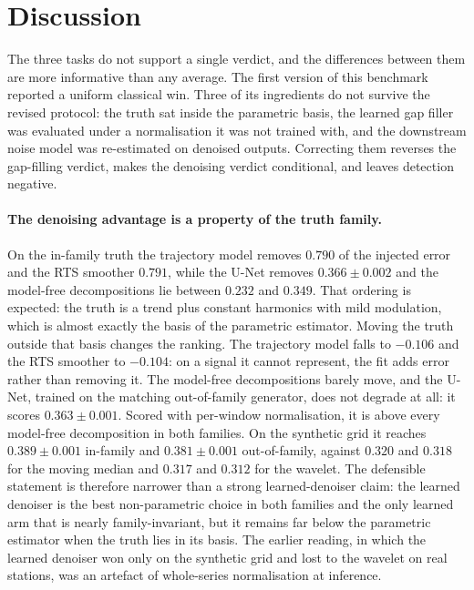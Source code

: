 \section{Discussion}
\label{sec:discussion}

The three tasks do not support a single verdict, and the differences between
them are more informative than any average. The first version of this benchmark
reported a uniform classical win. Three of its ingredients do not survive the
revised protocol: the truth sat inside the parametric basis, the learned gap
filler was evaluated under a normalisation it was not trained with, and the
downstream noise model was re-estimated on denoised outputs. Correcting them
reverses the gap-filling verdict, makes the denoising verdict conditional, and
leaves detection negative.

\paragraph{The denoising advantage is a property of the truth family.}
On the in-family truth the trajectory model removes $0.790$ of the injected
error and the RTS smoother $0.791$, while the U-Net removes $0.366 \pm 0.002$
and the model-free decompositions lie between $0.232$ and $0.349$. That ordering
is expected: the truth is a trend plus constant harmonics with mild modulation,
which is almost exactly the basis of the parametric estimator. Moving the truth
outside that basis changes the ranking. The trajectory model falls to $-0.106$
and the RTS smoother to $-0.104$: on a signal it cannot represent, the fit adds
error rather than removing it. The model-free decompositions barely move, and
the U-Net, trained on the matching out-of-family generator, does not degrade at
all: it scores $0.363 \pm 0.001$. Scored with per-window normalisation, it is
above every model-free decomposition in both families. On the synthetic grid it
reaches $0.389 \pm 0.001$ in-family and $0.381 \pm 0.001$ out-of-family, against
$0.320$ and $0.318$ for the moving median and $0.317$ and $0.312$ for the
wavelet. The defensible statement is therefore narrower than a strong
learned-denoiser claim: the learned denoiser is the best non-parametric choice
in both families and the only learned arm that is nearly family-invariant, but
it remains far below the parametric estimator when the truth lies in its basis.
The earlier reading, in which the learned denoiser won only on the synthetic
grid and lost to the wavelet on real stations, was an artefact of whole-series
normalisation at inference.


